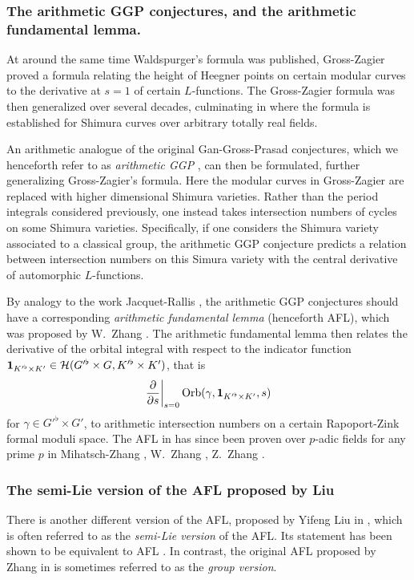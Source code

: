 \subsubsection{The arithmetic GGP conjectures, and the arithmetic fundamental lemma.}
At around the same time Waldspurger's formula was published,
Gross-Zagier \cite{ref:gross_zagier} proved a formula
relating the height of Heegner points
on certain modular curves to the derivative at $s=1$ of certain $L$-functions.
The Gross-Zagier formula was then generalized over several decades,
culminating in \cite{ref:GZshimura} where the formula is established
for Shimura curves over arbitrary totally real fields.

An arithmetic analogue of the original Gan-Gross-Prasad conjectures,
which we henceforth refer to as \emph{arithmetic GGP} \cite{ref:GGP},
can then be formulated, further generalizing Gross-Zagier's formula.
Here the modular curves in Gross-Zagier
are replaced with higher dimensional Shimura varieties.
Rather than the period integrals considered previously,
one instead takes intersection numbers of cycles on some Shimura varieties.
Specifically, if one considers the Shimura variety associated to a classical group,
the arithmetic GGP conjecture predicts a relation between intersection numbers
on this Simura variety with the central derivative of automorphic $L$-functions.

By analogy to the work Jacquet-Rallis \cite{ref:JR},
the arithmetic GGP conjectures should have a corresponding
\emph{arithmetic fundamental lemma} (henceforth AFL),
which was proposed by W.\ Zhang \cite[Conjecture 2.9]{ref:AFL}.
The arithmetic fundamental lemma then relates the derivative
of the orbital integral with respect to the indicator function
$\mathbf{1}_{K'^\flat \times K'} \in \mathcal H(G'^\flat \times G, K'^\flat \times K')$, that is
\[ \left. \pdv{}{s} \right\rvert_{s=0} \operatorname{Orb}(\gamma, \mathbf{1}_{K'^\flat \times K'}, s) \]
for $\gamma \in G'^\flat \times G'$,
to arithmetic intersection numbers on a certain Rapoport-Zink formal moduli space.
The AFL in \cite{ref:AFL} has since been proven over $p$-adic fields for any prime $p$ in
Mihatsch-Zhang \cite{ref:MZ2021}, W.\ Zhang \cite{ref:Wei2021}, Z.\ Zhang \cite{ref:Zhiyu}.

\subsubsection{The semi-Lie version of the AFL proposed by Liu}
There is another different version of the AFL, proposed by Yifeng Liu in
\cite[Conjecture 1.12]{ref:liuFJ},
which is often referred to as the \emph{semi-Lie version} of the AFL.
Its statement has been shown to be equivalent to AFL
\cite[Remark 1.13]{ref:liuFJ}.
In contrast, the original AFL proposed by Zhang in \cite[Conjecture 2.9]{ref:AFL}
is sometimes referred to as the \emph{group version}.

